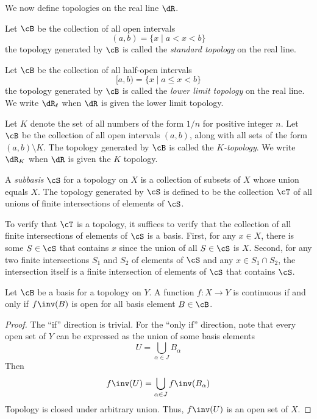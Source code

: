 \documentclass{amsart}
\begin{document}
We now define topologies on the real line $\dR$.

\begin{defn}
  Let $\cB$ be the collection of all open intervals
  \[
    (a,b) = \{x \mid a < x < b\}
  \]
  the topology generated by $\cB$ is called the \emph{standard topology} on the real line.
\end{defn}

\begin{defn}
  Let $\cB$ be the collection of all half-open intervals
  \[
    [a,b) = \{x \mid a \leq x < b\}
  \]
  the topology generated by $\cB$ is called the \emph{lower limit topology} on the real line.
  We write $\dR_{\ell}$ when $\dR$ is given the lower limit topology.
\end{defn}

\begin{defn}
  Let $K$ denote the set of all numbers of the form $1/n$ for positive integer $n$.
  Let $\cB$ be the collection of all open intervals $(a,b)$, along with all sets of the form $(a,b) \setminus K$.
  The topology generated by $\cB$ is called the \emph{$K$-topology}.
  We write $\dR_{K}$ when $\dR$ is given the $K$ topology.
\end{defn}

\begin{defn}
  A \emph{subbasis} $\cS$ for a topology on $X$ is a collection of subsets of $X$ whose union equals $X$.
  The topology generated by $\cS$ is defined to be the collection $\cT$ of all unions of finite intersections of elements of $\cS$.
\end{defn}
To verify that $\cT$ is a topology, it suffices to verify that the collection of all finite intersections of elements of $\cS$ is a basis.
First, for any $x \in X$, there is some $S \in \cS$ that contains $x$ since the union of all $S \in \cS$ is $X$.
Second, for any two finite intersections $S_{1}$ and $S_{2}$ of elements of $\cS$ and any $x \in S_{1} \cap S_{2}$, the intersection itself is a finite intersection of elements of $\cS$ that contains $\cS$.

\begin{lem}\label{lem:basis-continuous}
  Let $\cB$ be a basis for a topology on $Y$.
  A function $f : X \to Y$ is continuous if and only if $f\inv(B)$ is open for all basis element $B \in \cB$.
\end{lem}
\begin{proof}
  The ``if'' direction is trivial.
  For the ``only if'' direction, note that every open set of $Y$ can be expressed as the union of some basis elements
  \[
    U = \bigcup_{\alpha \in J}B_{\alpha}
  \]
  Then
  \[
    f\inv(U) = \bigcup_{\alpha \in J} f\inv(B_{\alpha})
  \]
  Topology is closed under arbitrary union.
  Thus, $f\inv(U)$ is an open set of $X$.
\end{proof}
\end{document}
